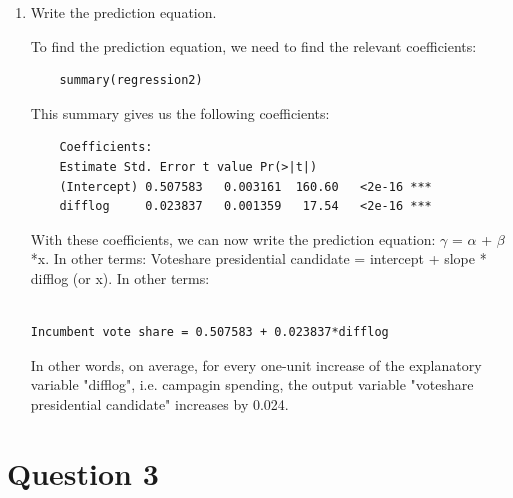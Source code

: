 \documentclass[12pt,letterpaper]{article}
\begin{document}
\begin{enumerate}
	\begin{BVerbatim}
residuals2 <- regression2$residuals
residuals2
	\end{BVerbatim}
		
		
		\item Write the prediction equation.

To find the prediction equation, we need to find the relevant coefficients: 

\begin{BVerbatim}
	summary(regression2)
\end{BVerbatim}

This summary gives us the following coefficients: 

\begin{BVerbatim}
	Coefficients:
	Estimate Std. Error t value Pr(>|t|)    
	(Intercept) 0.507583   0.003161  160.60   <2e-16 ***
	difflog     0.023837   0.001359   17.54   <2e-16 ***
\end{BVerbatim}

With these coefficients, we can now write the prediction equation:  $\gamma$ = $\alpha$ + $\beta$*x.
\newline In other terms: Voteshare presidential candidate = intercept + slope * difflog (or x). 
In other terms: 

\begin{BVerbatim}

Incumbent vote share = 0.507583 + 0.023837*difflog

\end{BVerbatim}
		
In other words, on average, for every one-unit increase of the explanatory variable "difflog", i.e. campagin spending, the output variable "voteshare presidential candidate" increases by 0.024. 	
	
	\end{enumerate}
	
	\newpage	
\section*{Question 3}
\end{document}
